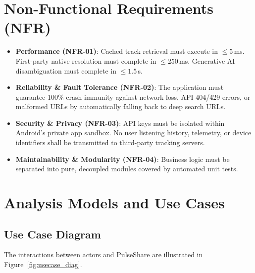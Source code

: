 \documentclass[12pt,a4paper]{report}
\begin{document}
\section{Non-Functional Requirements (NFR)}
\begin{itemize}
    \item \textbf{Performance (NFR-01)}: Cached track retrieval must execute in $\le 5$\,ms. First-party native resolution must complete in $\le 250$\,ms. Generative AI disambiguation must complete in $\le 1.5$\,s.
    \item \textbf{Reliability \& Fault Tolerance (NFR-02)}: The application must guarantee 100\% crash immunity against network loss, API 404/429 errors, or malformed URLs by automatically falling back to deep search URLs.
    \item \textbf{Security \& Privacy (NFR-03)}: API keys must be isolated within Android's private app sandbox. No user listening history, telemetry, or device identifiers shall be transmitted to third-party tracking servers.
    \item \textbf{Maintainability \& Modularity (NFR-04)}: Business logic must be separated into pure, decoupled modules covered by automated unit tests.
\end{itemize}

\section{Analysis Models and Use Cases}

\subsection{Use Case Diagram}
The interactions between actors and PulseShare are illustrated in Figure~\ref{fig:usecase_diag}.
\end{document}
